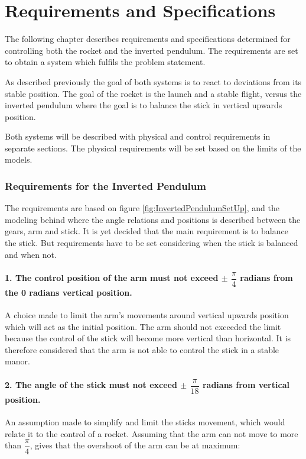 \chapter{Requirements and Specifications}
The following chapter describes requirements and specifications determined for controlling both the rocket and the inverted pendulum. The requirements are set to obtain a system which fulfils the problem statement.

As described previously the goal of both systems is to react to deviations from its stable position. The goal of the rocket is the launch and a stable flight, versus the inverted pendulum where the goal is to balance the stick in vertical upwards position.  

Both systems will be described with physical and control requirements in separate sections. The physical requirements will be set based on the limits of the models. 

\subsection{Requirements for the Inverted Pendulum}\label{sec:InvPendReq}
The requirements are based on figure \ref{fig:InvertedPendulumSetUp}, and the modeling behind where the angle relations and positions is described between the gears, arm and stick. It is yet decided that the main requirement is to balance the stick. But requirements have to be set considering when the stick is balanced and when not. 

\setlength{\parindent}{0pt}
\newcommand{\forceindent}{\leavevmode{\parindent=1em\indent}}

\subsubsection*{1. The control position of the arm must not exceed $\pm$ $\dfrac{\pi}{4}$ radians from the 0 radians vertical position.} 
\forceindent A choice made to limit the arm's movements around vertical upwards position which will act as the initial position. The arm should not exceeded the limit because the control of the stick will become more vertical than horizontal. It is therefore considered that the arm is not able to control the stick in a stable manor.  


\subsubsection*{2. The angle of the stick must not exceed $\pm$ $\dfrac{\pi}{18}$ radians from vertical position.}
\forceindent An assumption made to simplify and limit the sticks movement, which would relate it to the control of a rocket. Assuming that the arm can not move to more than $\dfrac{\pi}{4}$, gives that the overshoot of the arm can be at maximum:



